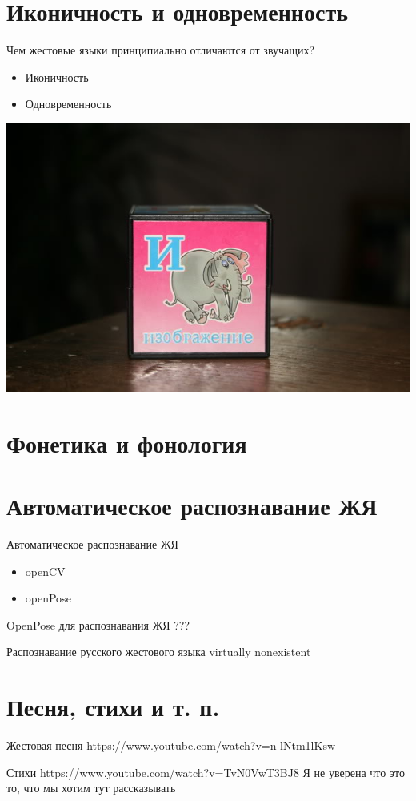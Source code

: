 \documentclass[13pt, t]{beamer}
\begin{document}
\section{Иконичность и одновременность} %
\begin{frame}{Чем жестовые языки принципиально отличаются от звучащих?}
\begin{itemize}
    \item Иконичность
    \item Одновременность
\end{itemize}
\includegraphics[width=\linewidth]{images/test}
\end{frame}

\section{Фонетика и фонология} %

\section{Автоматическое распознавание ЖЯ} %
\begin{frame}{Автоматическое распознавание ЖЯ}
    \begin{itemize}
        \item openCV
        \item openPose
    \end{itemize}
\end{frame}

\begin{frame}{OpenPose для распознавания ЖЯ}
    ???
\end{frame}

\begin{frame}{Распознавание русского жестового языка}
    virtually nonexistent
\end{frame}

\section{Песня, стихи и т. п.} %
\begin{frame}{Жестовая песня}
    https://www.youtube.com/watch?v=n-lNtm1lKsw
\end{frame}

\begin{frame}{Стихи}
https://www.youtube.com/watch?v=TvN0VwT3BJ8 
Я не уверена что это то, что мы хотим тут рассказывать 
\end{frame}
\end{document}
